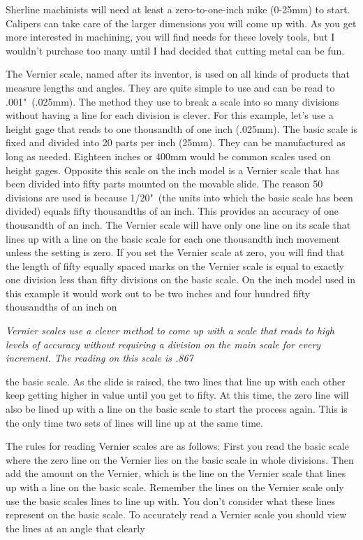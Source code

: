 Sherline machinists will need at least a zero-to-one-inch mike (0-25mm) to
start. Calipers can take care of the larger dimensions you will come up with. As
you get more interested in machining, you will find needs for these lovely
tools, but I wouldn't purchase too many until I had decided that cutting metal
can be fun.


The Vernier scale, named after its inventor, is used on all kinds of products
that measure lengths and angles. They are quite simple to use and can be read to
.001"\ (.025mm). The method they use to break a scale into so many divisions
without having a line for each division is clever. For this example, let's use a
height gage that reads to one thousandth of one inch (.025mm). The basic scale
is fixed and divided into 20 parts per inch (25mm). They can be manufactured as
long as needed. Eighteen inches or 400mm would be common scales used on height
gages. Opposite this scale on the inch model is a Vernier scale that has been
divided into fifty parts mounted on the movable slide. The reason 50 divisions
are used is because 1/20"\ (the units into which the basic scale has been
divided) equals fifty thousandths of an inch. This provides an accuracy of one
thousandth of an inch. The Vernier scale will have only one line on its scale
that lines up with a line on the basic scale for each one thousandth inch
movement unless the setting is zero. If you set the Vernier scale at zero, you
will find that the length of fifty equally spaced marks on the Vernier scale is
equal to exactly one division less than fifty divisions on the basic scale. On
the inch model used in this example it would work out to be two inches and four
hundred fifty thousandths of an inch on

\bigskip
\textit{Vernier scales use a clever method to come up with a scale that reads to
high levels of accuracy without requiring a division on the main scale for every
increment. The reading on this scale is .867}
\bigskip

the basic scale. As the slide is raised, the two lines that line up with each
other keep getting higher in value until you get to fifty. At this time, the
zero line will also be lined up with a line on the basic scale to start the
process again. This is the only time two sets of lines will line up at the same
time.

The rules for reading Vernier scales are as follows: First you read the basic
scale where the zero line on the Vernier lies on the basic scale in whole
divisions. Then add the amount on the Vernier, which is the line on the Vernier
scale that lines up with a line on the basic scale. Remember the lines on the
Vernier scale only use the basic scales lines to line up with. You don't
consider what these lines represent on the basic scale. To accurately read a
Vernier scale you should view the lines at an angle that clearly

